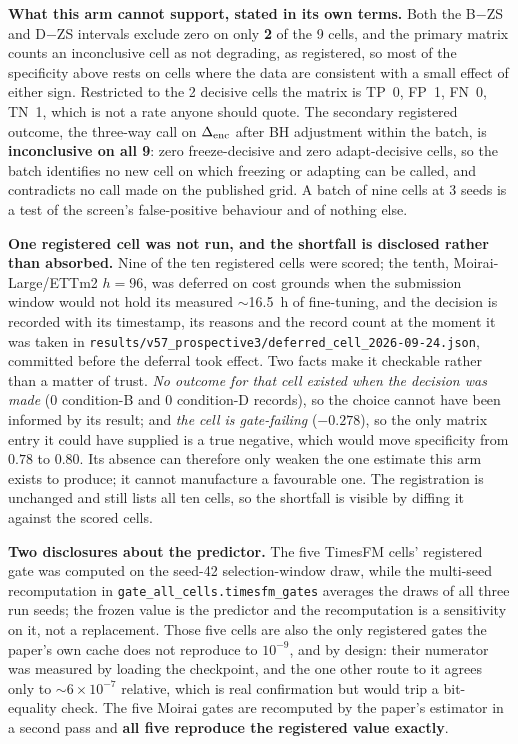 \textbf{What this arm cannot support, stated in its own terms.}  Both the B$-$ZS
and D$-$ZS intervals exclude zero on only \textbf{2} of the 9 cells, and the
primary matrix counts an inconclusive cell as not degrading, as registered, so
most of the specificity above rests on cells where the data are consistent with a
small effect of either sign.  Restricted to the 2 decisive cells the matrix is
TP~0, FP~1, FN~0, TN~1, which is not a rate anyone should quote.  The secondary
registered outcome, the three-way call on $\Delta_\text{enc}$ after BH adjustment within the
batch, is \textbf{inconclusive on all 9}: zero freeze-decisive and zero
adapt-decisive cells, so the batch identifies no new cell on which freezing or
adapting can be called, and contradicts no call made on the published grid.  A
batch of nine cells at 3 seeds is a test of the
screen's false-positive behaviour and of nothing else.

\textbf{One registered cell was not run, and the shortfall is disclosed rather
than absorbed.}  Nine of the ten registered cells were scored; the tenth,
Moirai-Large/ETTm2 $h{=}96$, was deferred on cost grounds when the submission
window would not hold its measured $\sim$16.5~h of fine-tuning, and the decision
is recorded with its timestamp, its reasons and the record count at the moment it
was taken in \texttt{results/v57\_prospective3/deferred\_cell\_2026-09-24.json},
committed before the deferral took effect.  Two facts make it checkable rather
than a matter of trust.  \emph{No outcome for that cell existed when the decision
was made} (0 condition-B and 0 condition-D records), so the choice cannot have
been informed by its result; and \emph{the cell is gate-failing} ($-0.278$), so
the only matrix entry it could have supplied is a true negative, which would move
specificity from $0.78$ to $0.80$.  Its absence can therefore only weaken the one
estimate this arm exists to produce; it cannot manufacture a favourable one.  The
registration is unchanged and still lists all ten cells, so the shortfall is
visible by diffing it against the scored cells.

\textbf{Two disclosures about the predictor.}  The five TimesFM cells' registered
gate was computed on the seed-42 selection-window draw, while the multi-seed
recomputation in \texttt{gate\_all\_cells.timesfm\_gates} averages the draws of
all three run seeds; the frozen value is the predictor and the recomputation is a
sensitivity on it, not a replacement.  Those five cells are also the only
registered gates the paper's own cache does not reproduce to $10^{-9}$, and by
design: their numerator was measured by loading the checkpoint, and the one other
route to it agrees only to ${\sim}6{\times}10^{-7}$ relative, which is real
confirmation but would trip a bit-equality check.  The five Moirai gates are
recomputed by the paper's estimator in a second pass and \textbf{all five
reproduce the registered value exactly}.

